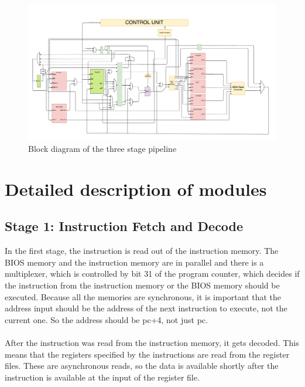 \documentclass[12pt]{article}
\begin{document}
\begin{figure}[!p]
\includegraphics[scale = 0.32, angle=90]{datapath_Diagram.pdf}
\caption{Block diagram of the three stage pipeline}
\label{fig:block-diagram}
\end{figure}


\section{Detailed description of modules}
\subsection{Stage 1: Instruction Fetch and Decode}
In the first stage, the instruction is read out of the instruction memory. The BIOS memory and the instruction memory are in parallel and there is a multiplexer, which is controlled by bit 31 of the program counter, which decides if the instruction from the instruction memory or the BIOS memory should be executed. Because all the memories are synchronous, it is important that the address input should be the address of the next instruction to execute, not the current one. So the address should be pc+4, not just pc. \\\\
After the instruction was read from the instruction memory, it gets decoded. This means that the registers specified by the instructions are read from the register files. These are asynchronous reads, so the data is available shortly after the instruction is available at the input of the register file.
\end{document}
